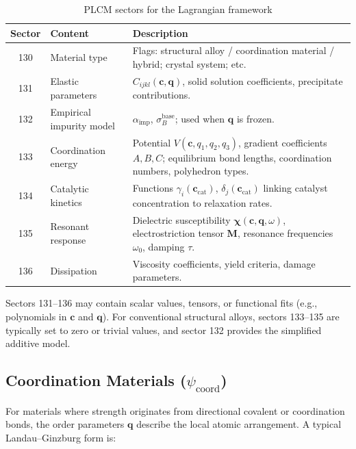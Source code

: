 \documentclass[12pt,a4paper]{article}
\begin{document}
	\begin{table}[htbp]
		\centering
		\caption{PLCM sectors for the Lagrangian framework}
		\label{tab:sectors}
		\begin{tabular}{clp{8cm}}
			\toprule
			\textbf{Sector} & \textbf{Content} & \textbf{Description} \\
			\midrule
			130 & Material type & Flags: structural alloy / coordination material / hybrid; crystal system; etc. \\
			131 & Elastic parameters & \(C_{ijkl}(\mathbf{c}, \mathbf{q})\), solid solution coefficients, precipitate contributions. \\
			132 & Empirical impurity model & \(\alpha_{\mathrm{imp}}\), \(\sigma_B^{\mathrm{base}}\); used when \(\mathbf{q}\) is frozen. \\
			133 & Coordination energy & Potential \(V(\mathbf{c}, q_1,q_2,q_3)\), gradient coefficients \(A,B,C\); equilibrium bond lengths, coordination numbers, polyhedron types. \\
			134 & Catalytic kinetics & Functions \(\gamma_i(\mathbf{c}_{\mathrm{cat}})\), \(\delta_j(\mathbf{c}_{\mathrm{cat}})\) linking catalyst concentration to relaxation rates. \\
			135 & Resonant response & Dielectric susceptibility \(\boldsymbol{\chi}(\mathbf{c},\mathbf{q},\omega)\), electrostriction tensor \(\mathbf{M}\), resonance frequencies \(\omega_0\), damping \(\tau\). \\
			136 & Dissipation & Viscosity coefficients, yield criteria, damage parameters. \\
			\bottomrule
		\end{tabular}
	\end{table}
	
	Sectors 131–136 may contain scalar values, tensors, or functional fits (e.g., polynomials in \(\mathbf{c}\) and \(\mathbf{q}\)). For conventional structural alloys, sectors 133–135 are typically set to zero or trivial values, and sector 132 provides the simplified additive model.
	
	\subsection{Coordination Materials (\(\psi_{\mathrm{coord}}\))}
	\label{subsec:coordination}
	
	For materials where strength originates from directional covalent or coordination bonds, the order parameters \(\mathbf{q}\) describe the local atomic arrangement. A typical Landau–Ginzburg form is:
	
\end{document}
